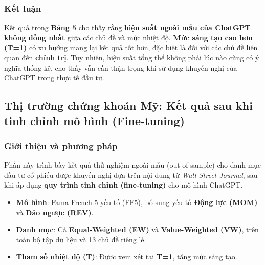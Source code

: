 \documentclass[a4paper,12pt]{article}
\begin{document}
\subsubsection{Kết luận}
Kết quả trong \textbf{Bảng 5} cho thấy rằng \textbf{hiệu suất ngoài mẫu của ChatGPT không đồng nhất} giữa các chủ đề và mức nhiệt độ. \textbf{Mức sáng tạo cao hơn (T=1)} có xu hướng mang lại kết quả tốt hơn, đặc biệt là đối với các chủ đề liên quan đến \textbf{chính trị}. Tuy nhiên, hiệu suất tổng thể không phải lúc nào cũng có ý nghĩa thống kê, cho thấy vẫn cần thận trọng khi sử dụng khuyến nghị của ChatGPT trong thực tế đầu tư.
\subsection{Thị trường chứng khoán Mỹ: Kết quả sau khi tinh chỉnh mô hình (Fine-tuning)}

\subsubsection{Giới thiệu và phương pháp}
Phần này trình bày kết quả thử nghiệm ngoài mẫu (out-of-sample) cho danh mục đầu tư cổ phiếu được khuyến nghị dựa trên nội dung từ \textit{Wall Street Journal}, sau khi áp dụng \textbf{quy trình tinh chỉnh (fine-tuning)} cho mô hình ChatGPT.
\begin{itemize}
    \item \textbf{Mô hình}: Fama-French 5 yếu tố (FF5), bổ sung yếu tố \textbf{Động lực (MOM)} và \textbf{Đảo ngược (REV)}.
    \item \textbf{Danh mục}: Cả \textbf{Equal-Weighted (EW)} và \textbf{Value-Weighted (VW)}, trên toàn bộ tập dữ liệu và 13 chủ đề riêng lẻ.
    \item \textbf{Tham số nhiệt độ (T)}: Được xem xét tại \textbf{T=1}, tăng mức sáng tạo.
\end{itemize}
\end{document}
